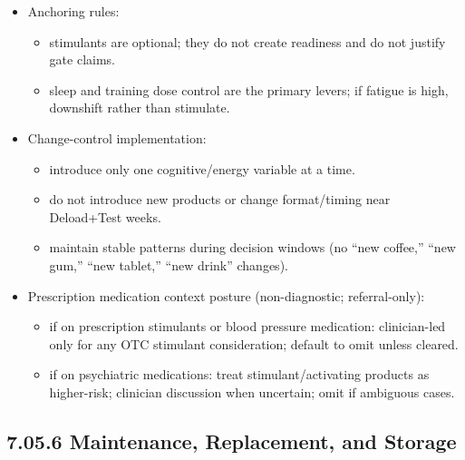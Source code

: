 \documentclass[10pt]{article}
\begin{document}
\begin{itemize}
\item Anchoring rules:
  \begin{itemize}
  \item stimulants are optional; they do not create readiness and do not justify gate claims.
  \item sleep and training dose control are the primary levers; if fatigue is high, downshift rather than stimulate.
  \end{itemize}
\item Change-control implementation:
  \begin{itemize}
  \item introduce only one cognitive/energy variable at a time.
  \item do not introduce new products or change format/timing near Deload+Test weeks.
  \item maintain stable patterns during decision windows (no “new coffee,” “new gum,” “new tablet,” “new drink” changes).
  \end{itemize}
\item Prescription medication context posture (non-diagnostic; referral-only):
  \begin{itemize}
  \item if on prescription stimulants or blood pressure medication: clinician-led only for any OTC stimulant consideration; default to omit unless cleared.
  \item if on psychiatric medications: treat stimulant/activating products as higher-risk; clinician discussion when uncertain; omit if ambiguous cases.
  \end{itemize}
\end{itemize}

\subsection*{7.05.6 Maintenance, Replacement, and Storage}
{}
\end{document}
